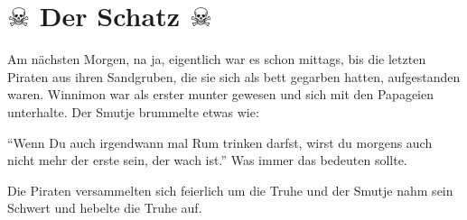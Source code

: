 \section*{\center $\skull$ Der Schatz $\skull$}
Am nächsten Morgen, na ja, eigentlich war es schon mittags, bis die letzten Piraten aus ihren Sandgruben, die sie sich als bett gegarben hatten, aufgestanden waren. Winnimon war als erster munter gewesen und sich mit den Papageien unterhalte. Der Smutje brummelte etwas wie: 

\enquote{Wenn Du auch irgendwann mal Rum trinken darfst, wirst du morgens auch nicht mehr der erste sein, der wach ist.} Was immer das bedeuten sollte.

Die Piraten versammelten sich feierlich um die Truhe und der Smutje nahm sein Schwert und hebelte die Truhe auf. 





  \hfill {\color{red}\decofourleft}

